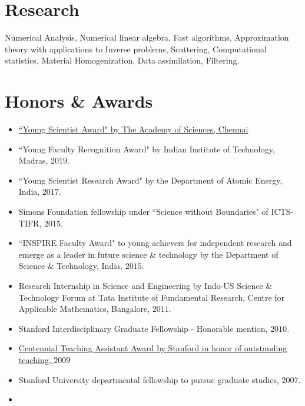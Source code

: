 \documentclass[margin,line]{resume}
\begin{document}
\begin{resume}
	\section{\mysidestyle Research}
Numerical Analysis, Numerical linear algebra, Fast algorithms, Approximation theory with applications to Inverse problems, Scattering, Computational statistics, Material Homogenization, Data assimilation, Filtering.
	\section{\mysidestyle Honors \& Awards}
	\vspace{-0.1em}
	\begin{itemize}
	\item
	\href{http://www.tnasc.com/young-scientist-awards/}{``Young Scientist Award" by The Academy of Sciences, Chennai}
	\item
	``Young Faculty Recognition Award" by Indian Institute of Technology, Madras, $2019$.
	\item
	``Young Scientist Research Award" by the Department of Atomic Energy, India, $2017$.
	\item
	Simons Foundation fellowship under ``Science without Boundaries" of ICTS-TIFR, $2015$.
	\item
	``INSPIRE Faculty Award" to young achievers for independent research and emerge as a leader in future science \& technology by the Department of Science \& Technology, India, $2015$.
	\item
	Research Internship in Science and Engineering by Indo-US Science \& Technology Forum at Tata Institute of Fundamental Research, Centre for Applicable Mathematics, Bangalore, $2011$.
	\item
	Stanford Interdisciplinary Graduate Fellowship - Honorable mention, $2010$.
	\item
	\href{https://news.stanford.edu/news/2009/june17/taprizes-061709.html}{Centennial Teaching Assistant Award by Stanford in honor of outstanding teaching, $2009$}
	\item
	Stanford University departmental fellowship to pursue graduate studies, $2007$.
	\item

\end{itemize}
\end{resume}
\end{document}
